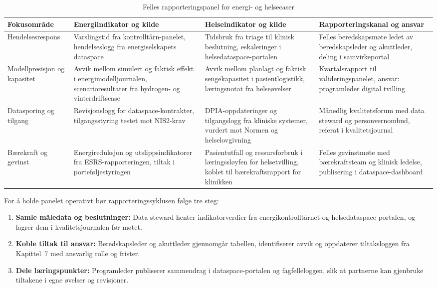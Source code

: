 \begin{table}[ht]
    \centering
    \caption{Felles rapporteringspanel for energi- og helsecaser}
    \label{tab:tverrsektorielt-panel}
    \begin{tabular}{|p{3.0cm}|p{4.5cm}|p{4.5cm}|p{3.2cm}|}
        \hline
        \textbf{Fokusområde} & \textbf{Energiindikator og kilde} & \textbf{Helseindikator og kilde} & \textbf{Rapporteringskanal og ansvar} \\
        \hline
        Hendelsesrespons & Varslingstid fra kontrolltårn-panelet, hendelseslogg fra energiselskapets dataspace \citep{energinorge2023beredskap,nhn2024dataspace} & Tidsbruk fra triage til klinisk beslutning, eskaleringer i helsedataspace-portalen \citep{helsedir2023beredskap,helseplattformen2023kontinuitet} & Felles beredskapsmøte ledet av beredskapsleder og akuttleder, deling i samvirkeportal \\
        \hline
        Modellpresisjon og kapasitet & Avvik mellom simulert og faktisk effekt i energimodelljournalen, scenarioresultater fra hydrogen- og vinterdriftscase & Avvik mellom planlagt og faktisk sengekapasitet i pasientlogistikk, læringsnotat fra helseøvelser & Kvartalsrapport til valideringspanelet, ansvar: programleder digital tvilling \\
        \hline
        Datasporing og tilgang & Revisjonslogg for dataspace-kontrakter, tilgangsstyring testet mot NIS2-krav \citep{digdir2024samstyring,dsb2024nser} & DPIA-oppdateringer og tilgangslogg fra kliniske systemer, vurdert mot Normen og helselovgivning \citep{helsedir2023beredskap,helseplattformen2023kontinuitet} & Månedlig kvalitetsforum med data steward og personvernombud, referat i kvalitetsjournal \\
        \hline
        Bærekraft og gevinst & Energireduksjon og utslippsindikatorer fra ESRS-rapporteringen, tiltak i porteføljestyringen & Pasientutfall og ressursforbruk i læringssløyfen for helsetvilling, koblet til bærekraftsrapport for klinikken & Felles gevinstmøte med bærekraftsteam og klinisk ledelse, publisering i dataspace-dashboard \citep{efrag2023esrs,dsb2023totalberedskap} \\
        \hline
    \end{tabular}
\end{table}

For å holde panelet operativt bør rapporteringssyklusen følge tre steg:
\begin{enumerate}
    \item \textbf{Samle måledata og beslutninger:} Data steward henter indikatorverdier fra energikontrolltårnet og helsedataspace-portalen, og lagrer dem i kvalitetsjournalen før møtet.\citep{nhn2024dataspace}
    \item \textbf{Koble tiltak til ansvar:} Beredskapsleder og akuttleder gjennomgår tabellen, identifiserer avvik og oppdaterer tiltaksloggen fra Kapittel~7 med ansvarlig rolle og frister.
    \item \textbf{Dele læringspunkter:} Programleder publiserer sammendrag i dataspace-portalen og fagfelleloggen, slik at partnerne kan gjenbruke tiltakene i egne øvelser og revisjoner.\citep{digdir2024samstyring,dsb2024nser}
\end{enumerate}

